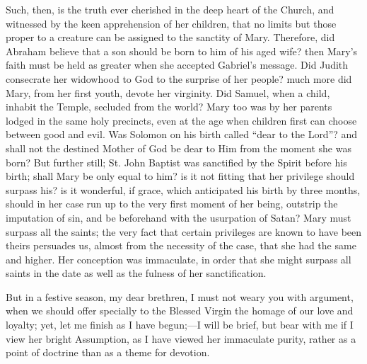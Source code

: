 Such, then, is the truth ever cherished in the deep heart of the
Church, and witnessed by the keen apprehension of her children, that
no limits but those proper to a creature can be assigned to the
sanctity of Mary. Therefore, did Abraham believe that a son should be
born to him of his aged wife? then Mary's faith must be held as
greater when she accepted Gabriel's message. Did Judith consecrate her
widowhood to God to the surprise of her people? much more did Mary,
from her first youth, devote her virginity. Did Samuel, when a child,
inhabit the Temple, secluded from the world? Mary too was by her
parents lodged in the same holy precincts, even at the age when
children first can choose between good and evil. Was Solomon on his
birth called ``dear to the Lord''? and shall not the destined
Mother of God be dear to Him from the moment she was born? But further
still; St. John Baptist was sanctified by the Spirit before his birth;
shall Mary be only equal to him? is it not fitting that her privilege
should surpass his? is it wonderful, if grace, which anticipated his
birth by three months, should in her case run up to the very first
moment of her being, outstrip the imputation of sin, and be beforehand
with the usurpation of Satan? Mary must surpass all the saints; the
very fact that certain privileges are known to have been theirs
persuades us, almost from the necessity of the case, that she had the
same and higher. Her conception was immaculate, in order that she
might surpass all saints in the date as well as the fulness of her
sanctification.

But in a festive season, my dear brethren, I must not weary you
with argument, when we should offer specially to the Blessed Virgin
the homage of our love and loyalty; yet, let me finish as I have
begun;—I will be brief, but bear with me if I view her bright
Assumption, as I have viewed her immaculate purity, rather as a point
of doctrine than as a theme for devotion.

